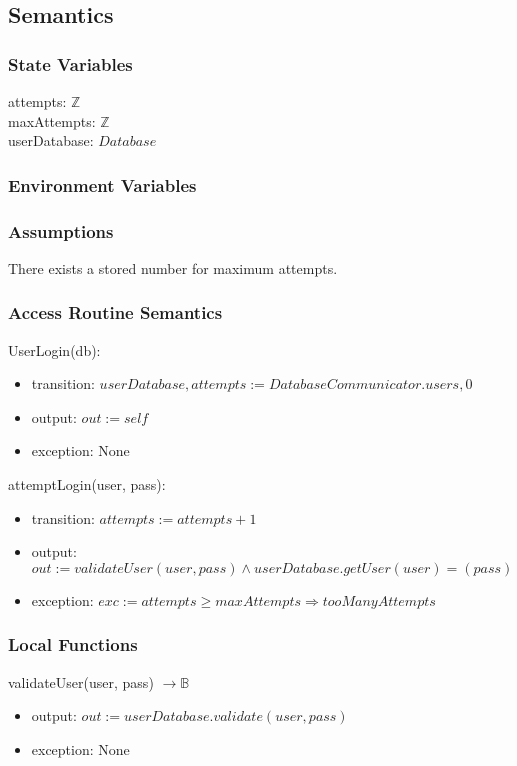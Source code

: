 \documentclass[12pt, titlepage]{article}
\begin{document}
\subsection{Semantics}

\subsubsection{State Variables}
attempts: $\mathbb{Z}$\\
maxAttempts: $\mathbb{Z}$\\
userDatabase: $Database$ \\
\subsubsection{Environment Variables}

\subsubsection{Assumptions}
There exists a stored number for maximum attempts.
\subsubsection{Access Routine Semantics}

\noindent UserLogin(db):
\begin{itemize}
	\item transition: $userDatabase, attempts := DatabaseCommunicator.users, 0$
	\item output: $out := self$
	\item exception: None
\end{itemize}

\noindent attemptLogin(user, pass):
\begin{itemize}
	\item transition: $attempts := attempts + 1$
	\item output: $out := validateUser(user, pass) \land userDatabase.getUser(user) = (pass)$
	\item exception: $exc := attempts \ge maxAttempts \Rightarrow tooManyAttempts$
\end{itemize}

\subsubsection{Local Functions}

\noindent validateUser(user, pass) $\rightarrow \mathbb{B}$
\begin{itemize}
	\item output: $out := userDatabase.validate(user, pass)$
	\item exception: None
\end{itemize}
\newpage
\end{document}
